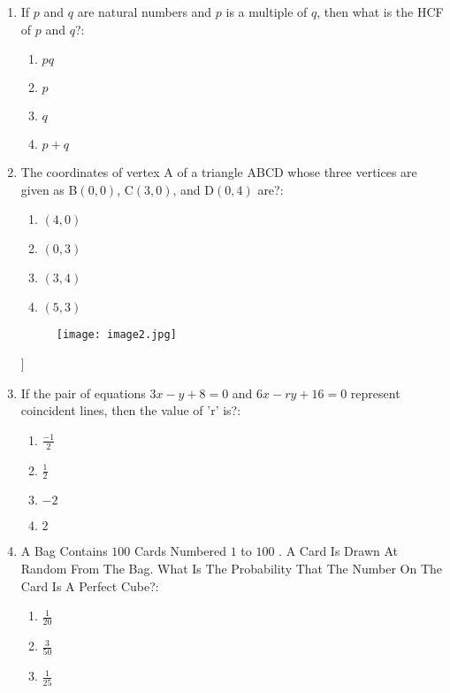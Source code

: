 \documentclass[12pt-letter paper]{article}
\providecommand{\brak}[1]{\ensuremath{\left(#1\right)}}
\begin{document}
\begin{enumerate}
\begin{figure}[!ht]
\end{figure}                                            
\item If $p$ and $q$ are natural numbers and $p$ is a multiple of $q$, then what is the HCF of $p$ and $q$?:
\begin{enumerate}
\item $ pq $  
\item $ p $                                        
\item $ q $                              
\item $ p+q $
\end{enumerate}
\item  The coordinates of vertex A of a triangle ABCD whose three vertices are given as B\brak{0,0}, C\brak{3,0}, and D\brak{0,4} are?:  
\begin{enumerate}
\item $  \brak{4,0} $                      
\item $  \brak{0,3} $                          
\item $  \brak{3,4} $                                  
\item $  \brak{5,3} $
\end{enumerate}
\begin{figure}[!ht]
\centering
\texttt{[image: image2.jpg]}      
\label{fig:enter-label}
\end{figure}]
\item If the pair of equations $3x - y + 8 = 0$ and $6x - ry + 16 = 0$ represent coincident lines, then the value of 'r' is?:                          \begin{enumerate}        
\item $ \frac{-1}{2} $                        
\item $ \frac{1}{2} $                        
\item $ -2 $      
\item $ 2 $
\end{enumerate}
\item A Bag Contains $100$ Cards Numbered $1$ to $100$ . A Card Is Drawn At Random From The Bag. What Is The Probability That The Number On The Card Is A Perfect Cube?:    
\begin{enumerate}
\item $ \frac{1}{20} $              
\item $ \frac{3}{50} $                    
\item $ \frac{1}{25} $                                                

\end{enumerate}
\end{enumerate}
\end{document}
